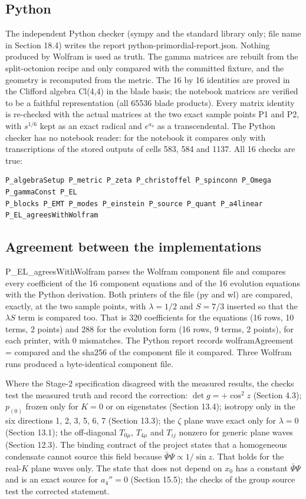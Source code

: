 \documentclass[11pt]{article}
\begin{document}
\subsection{Python}

The independent Python checker (sympy and the standard library only; file name in Section 18.4) writes the report python-primordial-report.json. Nothing produced by Wolfram is used as truth. The gamma matrices are rebuilt from the split-octonion recipe and only compared with the committed fixture, and the geometry is recomputed from the metric. The 16 by 16 identities are proved in the Clifford algebra Cl(4,4) in the blade basis; the notebook matrices are verified to be a faithful representation (all 65536 blade products). Every matrix identity is re-checked with the actual matrices at the two exact sample points P1 and P2, with $s^{1/6}$ kept as an exact radical and $e^{a_4}$ as a transcendental. The Python checker has no notebook reader: for the notebook it compares only with transcriptions of the stored outputs of cells 583, 584 and 1137. All 16 checks are true:

\begin{Verbatim}[fontsize=\small]
P_algebraSetup P_metric P_zeta P_christoffel P_spinconn P_Omega P_gammaConst P_EL
P_blocks P_EMT P_modes P_einstein P_source P_quant P_a4linear P_EL_agreesWithWolfram
\end{Verbatim}

\subsection{Agreement between the implementations}

P\_EL\_agreesWithWolfram parses the Wolfram component file and compares every coefficient of the 16 component equations and of the 16 evolution equations with the Python derivation. Both printers of the file (py and wl) are compared, exactly, at the two sample points, with $\lambda=1/2$ and $S=7/3$ inserted so that the $\lambda S$ term is compared too. That is 320 coefficients for the equations (16 rows, 10 terms, 2 points) and 288 for the evolution form (16 rows, 9 terms, 2 points), for each printer, with 0 mismatches. The Python report records wolframAgreement = compared and the sha256 of the component file it compared. Three Wolfram runs produced a byte-identical component file.

Where the Stage-2 specification disagreed with the measured results, the checks test the measured truth and record the correction: $\det g=+\cos^2z$ (Section 4.3); $p_{(0)}$ frozen only for $K=0$ or on eigenstates (Section 13.4); isotropy only in the six directions 1, 2, 3, 5, 6, 7 (Section 13.3); the $\zeta$ plane wave exact only for $\lambda=0$ (Section 13.1); the off-diagonal $T_{0\mu}$, $T_{4\mu}$ and $T_{ij}$ nonzero for generic plane waves (Section 12.3). The binding contract of the project states that a homogeneous condensate cannot source this field because $\bar\Psi\Psi\propto1/\sin z$. That holds for the real-$K$ plane waves only. The state that does not depend on $x_0$ has a constant $\bar\Psi\Psi$ and is an exact source for $a_4''=0$ (Section 15.5); the checks of the group source test the corrected statement.
\end{document}
